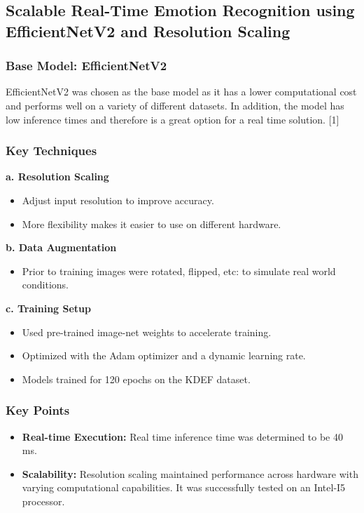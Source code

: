 \documentclass{article}
\begin{document}
\subsection*{Scalable Real-Time Emotion Recognition using EfficientNetV2 and Resolution Scaling}

\subsubsection*{Base Model: EfficientNetV2}
EfficientNetV2 was chosen as the base model as it has a lower computational cost and performs well on a variety of different datasets.
In addition, the model has low inference times and therefore is a great option for a real time solution. [1]

\subsubsection*{Key Techniques}
\textbf{a. Resolution Scaling}
\begin{itemize}
    \item Adjust input resolution to improve accuracy.
    \item More flexibility makes it easier to use on different hardware.
\end{itemize}

\textbf{b. Data Augmentation}
\begin{itemize}
    \item Prior to training images were rotated, flipped, etc: to simulate real world conditions.
\end{itemize}

\textbf{c. Training Setup}
\begin{itemize}
    \item Used pre-trained image-net weights to accelerate training.
    \item Optimized with the Adam optimizer and a dynamic learning rate.
    \item Models trained for 120 epochs on the KDEF dataset.
\end{itemize}

\subsubsection*{Key Points}
\begin{itemize}
    \item \textbf{Real-time Execution:} Real time inference time was determined to be 40 ms.
    \item \textbf{Scalability:} Resolution scaling maintained performance across hardware with varying computational capabilities. It was successfully tested on an Intel-I5 processor.
\end{itemize}
\end{document}
